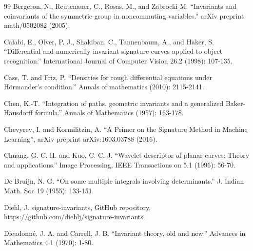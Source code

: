 \documentclass{scrartcl}
\theoremstyle{plain}
\theoremstyle{definition}
\newcommand{\1}[1]{1_{\{#1\}}}
\let\todon\todo
\newcommand{\todonotes}[1]{\todon{\color{red}#1}}
\renewcommand{\todo}[1]{ \textbf{\color{Orange}(#1)} }
\begin{document}




\begin{thebibliography}{99}
    Bergeron, N., Reutenauer, C., Rosas, M., and Zabrocki M.
    ``Invariants and coinvariants of the symmetric group in noncommuting variables.'' arXiv preprint math/0502082 (2005).

    Calabi, E., Olver, P. J., Shakiban, C., Tannenbaum, A., and Haker, S.
    ``Differential and numerically invariant signature curves applied to object
    recognition.'' International Journal of Computer Vision 26.2 (1998):
    107-135.

    Cass, T. and Friz, P. ``Densities for rough differential equations under Hörmander's condition.'' Annals of mathematics (2010): 2115-2141.

    Chen, K.-T. ``Integration of paths, geometric invariants and a generalized Baker-Hausdorff formula.'' Annals of Mathematics (1957): 163-178.
   
    Chevyrev, I. and Kormilitzin, A. ``A Primer on the Signature Method in Machine Learning'', arXiv preprint arXiv:1603.03788 (2016).

    Chuang, G. C. H. and Kuo, C.-C. J. ``Wavelet descriptor of planar curves: Theory and applications.'' Image Processing, IEEE Transactions on 5.1 (1996): 56-70.

    De Bruijn, N. G. ``On some multiple integrals involving determinants.'' J. Indian Math. Soc 19 (1955): 133-151.

    Diehl, J. signature-invariants, GitHub repository, \url{https://github.com/diehlj/signature-invariants}.

    Dieudonn\'e, J. A. and Carrell, J. B. ``Invariant theory, old and new.'' Advances in Mathematics 4.1 (1970): 1-80.


\end{thebibliography}
\end{document}
